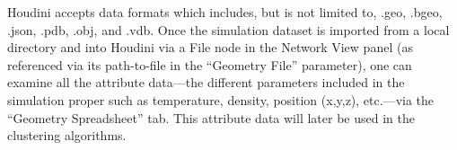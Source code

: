 \documentclass[fleqn,usenatbib,useAMS]{mnras}
\begin{document}
Houdini accepts data formats which includes, but is not limited to, .geo, .bgeo, .json, .pdb, .obj, and .vdb. Once the simulation dataset is imported from a local directory and into Houdini via a File node in the Network View panel (as referenced via its path-to-file in the ``Geometry File'' parameter), one can examine all the attribute data---the different parameters included in the simulation proper such as temperature, density, position (x,y,z), etc.---via the ``Geometry Spreadsheet'' tab. This attribute data will later be used in the clustering algorithms. \par




\end{document}
